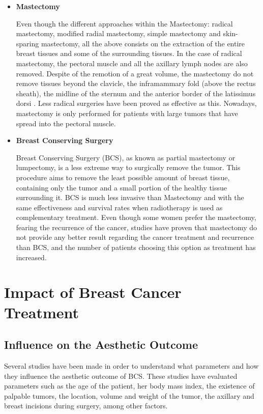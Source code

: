 \begin{itemize}
\item \textbf{Mastectomy}

Even though the different approaches within the Mastectomy: radical mastectomy, modified radial mastectomy, simple mastectomy and skin-sparing mastectomy, all the above consists on the extraction of the entire breast tissues and some of the surrounding tissues. In the case of radical mastectomy, the pectoral muscle and all the axillary lymph nodes are also removed. Despite of the remotion of a great volume, the mastectomy do not remove tissues beyond the clavicle, the inframammary fold (above the rectus sheath), the midline of the sternum and the anterior border of the latissimus dorsi \cite{Witmer2004}. Less radical surgeries have been proved as effective as this. Nowadays, mastectomy is only performed for patients with large tumors that have spread into the pectoral muscle.

\item \textbf{Breast Conserving Surgery}

Breast Conserving Surgery (BCS), as known as partial mastectomy or lumpectomy, is a less extreme way to surgically remove the tumor. This procedure aims to remove the least possible amount of breast tissue, containing only the tumor and a small portion of the healthy tissue surrounding it. BCS is much less invasive than Mastectomy and with the same effectiveness and survival rates when radiotherapy is used as complementary treatment. Even though some women prefer the mastectomy, fearing the recurrence of the cancer, studies have proven that mastectomy do not provide any better result regarding the cancer treatment and recurrence than BCS, and the number of patients choosing this option as treatment has increased.
\end{itemize}

\section{Impact of Breast Cancer Treatment}

\subsection{Influence on the Aesthetic Outcome}

Several studies have been made in order to understand what parameters and how they influence the aesthetic outcome of BCS. These studies have evaluated parameters such as the age of the patient, her body mass index, the existence of palpable tumors, the location, volume and weight of the tumor, the axillary and breast incisions during surgery, among other factors.

